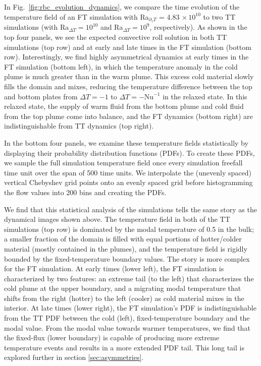 \documentclass[aps, pre, onecolumn, nofootinbib, notitlepage, groupedaddress, amsfonts, amssymb, amsmath, longbibliography, superscriptaddress]{revtex4-1}
\begin{document}
In Fig.~\ref{fig:rbc_evolution_dynamics}, we compare the time evolution of the temperature field of an FT simulation with Ra$_{\partial_z T}$ = 4.83$\,\times 10^{10}$ to two TT simulations (with Ra$_{\Delta T} = 10^{10}$ and Ra$_{\Delta T} = 10^9$, respectively).
As shown in the top four panels, we see the expected convective roll solution in both TT simulations (top row) and at early and late times in the FT simulation (bottom row).
Interestingly, we find highly asymmetrical dynamics at early times in the FT simulation (bottom left), in which the temperature anomaly in the cold plume is much greater than in the warm plume.
This excess cold material slowly fills the domain and mixes, reducing the temperature difference between the top and bottom plates from $\Delta T = -1$ to $\Delta T = -\text{Nu}^{-1}$ in the relaxed state.
In this relaxed state, the supply of warm fluid from the bottom plume and cold fluid from the top plume come into balance, and the FT dynamics (bottom right) are indistinguishable from TT dynamics (top right).

In the bottom four panels, we examine these temperature fields statistically by displaying their probability distribution functions (PDFs).
To create these PDFs, we sample the full simulation temperature field once every simulation freefall time unit over the span of 500 time units.
We interpolate the (unevenly spaced) vertical Chebyshev grid points onto an evenly spaced grid before histogramming the flow values into 200 bins and creating the PDFs.

We find that this statistical analysis of the simulations tells the same story as the dynamical images shown above.
The temperature field in both of the TT simulations (top row) is dominated by the modal temperature of 0.5 in the bulk; a smaller fraction of the domain is filled with equal portions of hotter/colder material (mostly contained in the plumes), and the temperature field is rigidly bounded by the fixed-temperature boundary values.
The story is more complex for the FT simulation.
At early times (lower left), the FT simulation is characterized by two features: an extreme tail (to the left) that characterizes the cold plume at the upper boundary, and a migrating modal temperature that shifts from the right (hotter) to the left (cooler) as cold material mixes in the interior.
At late times (lower right), the FT simulation's PDF is indistinguishable from the TT PDF between the cold (left), fixed-temperature boundary and the modal value.
From the modal value towards warmer temperatures, we find that the fixed-flux (lower boundary) is capable of producing more extreme temperature events and results in a more extended PDF tail.
This long tail is explored further in section \ref{sec:asymmetries}.
\end{document}
